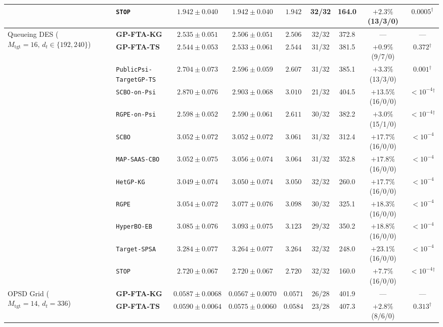 \begin{table}[htbp]
{\begin{tabular}{llccccccc}
 & \texttt{STOP} & $1.942 \pm 0.040$ & $1.942 \pm 0.040$ & $1.942$ & 32/32 & 164.0 & $+2.3\%$ (13/3/0) & $0.0005{}^{\dagger}$ \\
\midrule
\multirow{12}{*}{Queueing DES ($M_{\mathrm{tgt}}\!=\!16,\, d_t\!\in\!\{192,240\}$)} & \textbf{GP-FTA-KG} & $2.535 \pm 0.051$ & $\mathbf{2.506 \pm 0.051}$ & $\mathbf{2.506}$ & 32/32 & 372.8 & --- & --- \\
 & \textbf{GP-FTA-TS} & $2.544 \pm 0.053$ & $2.533 \pm 0.061$ & $2.544$ & 31/32 & 381.5 & $+0.9\%$ (9/7/0) & $0.372{}^{\dagger}$ \\
 & \texttt{PublicPsi-TargetGP-TS} & $2.704 \pm 0.073$ & $2.596 \pm 0.059$ & $2.607$ & 31/32 & 385.1 & $+3.3\%$ (13/3/0) & $0.001{}^{\dagger}$ \\
 & \texttt{SCBO-on-Psi} & $2.870 \pm 0.076$ & $2.903 \pm 0.068$ & $3.010$ & 21/32 & 404.5 & $+13.5\%$ (16/0/0) & $<10^{-4}{}^{\dagger}$ \\
 & \texttt{RGPE-on-Psi} & $2.598 \pm 0.052$ & $2.590 \pm 0.061$ & $2.611$ & 30/32 & 382.2 & $+3.0\%$ (15/1/0) & $<10^{-4}{}^{\dagger}$ \\
 & \texttt{SCBO} & $3.052 \pm 0.072$ & $3.052 \pm 0.072$ & $3.061$ & 31/32 & 312.4 & $+17.7\%$ (16/0/0) & $<10^{-4}$ \\
 & \texttt{MAP-SAAS-CBO} & $3.052 \pm 0.075$ & $3.056 \pm 0.074$ & $3.064$ & 31/32 & 352.8 & $+17.8\%$ (16/0/0) & $<10^{-4}$ \\
 & \texttt{HetGP-KG} & $3.049 \pm 0.074$ & $3.050 \pm 0.074$ & $3.050$ & 32/32 & 260.0 & $+17.7\%$ (16/0/0) & $<10^{-4}$ \\
 & \texttt{RGPE} & $3.054 \pm 0.072$ & $3.077 \pm 0.076$ & $3.098$ & 30/32 & 325.1 & $+18.3\%$ (16/0/0) & $<10^{-4}$ \\
 & \texttt{HyperBO-EB} & $3.085 \pm 0.076$ & $3.093 \pm 0.075$ & $3.123$ & 29/32 & 350.2 & $+18.8\%$ (16/0/0) & $<10^{-4}$ \\
 & \texttt{Target-SPSA} & $3.284 \pm 0.077$ & $3.264 \pm 0.077$ & $3.264$ & 32/32 & 248.0 & $+23.1\%$ (16/0/0) & $<10^{-4}$ \\
 & \texttt{STOP} & $2.720 \pm 0.067$ & $2.720 \pm 0.067$ & $2.720$ & 32/32 & 160.0 & $+7.7\%$ (16/0/0) & $<10^{-4}{}^{\dagger}$ \\
\midrule
\multirow{12}{*}{OPSD Grid ($M_{\mathrm{tgt}}\!=\!14,\, d_t\!=\!336$)} & \textbf{GP-FTA-KG} & $0.0587 \pm 0.0068$ & $\mathbf{0.0567 \pm 0.0070}$ & $\mathbf{0.0571}$ & 26/28 & 401.9 & --- & --- \\
 & \textbf{GP-FTA-TS} & $0.0590 \pm 0.0064$ & $0.0575 \pm 0.0060$ & $0.0584$ & 23/28 & 407.3 & $+2.8\%$ (8/6/0) & $0.313{}^{\dagger}$ \\

\end{tabular}}
\end{table}

